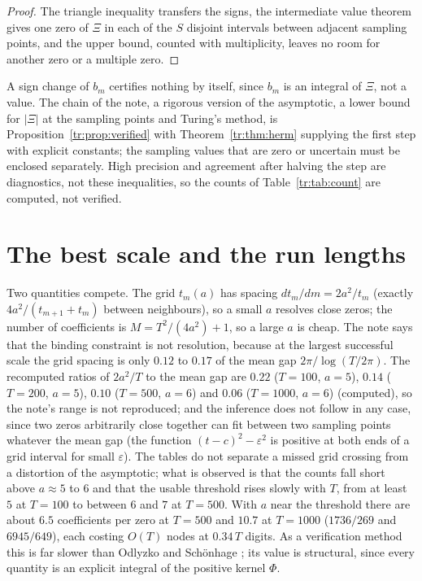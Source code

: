 \begin{proof}
The triangle inequality transfers the signs, the intermediate value theorem gives one zero of $\Xi$ in each of the $S$ disjoint intervals between adjacent sampling points, and the upper bound, counted with multiplicity, leaves no room for another zero or a multiple zero.
\end{proof}

A sign change of $b_m$ certifies nothing by itself, since $b_m$ is an integral of $\Xi$, not a value. The chain of the note, a rigorous version of the asymptotic, a lower bound for $|\Xi|$ at the sampling points and Turing's method, is Proposition~\ref{tr:prop:verified} with Theorem~\ref{tr:thm:herm} supplying the first step with explicit constants; the sampling values that are zero or uncertain must be enclosed separately. High precision and agreement after halving the step are diagnostics, not these inequalities, so the counts of Table~\ref{tr:tab:count} are computed, not verified.

\section{The best scale and the run lengths}\label{tr:sec:scale}

Two quantities compete. The grid $t_m(a)$ has spacing $dt_m/dm=2a^2/t_m$ (exactly $4a^2/(t_{m+1}+t_m)$ between neighbours), so a small $a$ resolves close zeros; the number of coefficients is $M=T^2/(4a^2)+1$, so a large $a$ is cheap. The note says that the binding constraint is not resolution, because at the largest successful scale the grid spacing is only $0.12$ to $0.17$ of the mean gap $2\pi/\log(T/2\pi)$. The recomputed ratios of $2a^2/T$ to the mean gap are $0.22$ ($T=100$, $a=5$), $0.14$ ($T=200$, $a=5$), $0.10$ ($T=500$, $a=6$) and $0.06$ ($T=1000$, $a=6$) (computed), so the note's range is not reproduced; and the inference does not follow in any case, since two zeros arbitrarily close together can fit between two sampling points whatever the mean gap (the function $(t-c)^2-\varepsilon^2$ is positive at both ends of a grid interval for small $\varepsilon$). The tables do not separate a missed grid crossing from a distortion of the asymptotic; what is observed is that the counts fall short above $a\approx5$ to $6$ and that the usable threshold rises slowly with $T$, from at least $5$ at $T=100$ to between $6$ and $7$ at $T=500$. With $a$ near the threshold there are about $6.5$ coefficients per zero at $T=500$ and $10.7$ at $T=1000$ ($1736/269$ and $6945/649$), each costing $O(T)$ nodes at $0.34\,T$ digits. As a verification method this is far slower than Odlyzko and Sch\"onhage \cite{OS88}; its value is structural, since every quantity is an explicit integral of the positive kernel $\Phi$.

